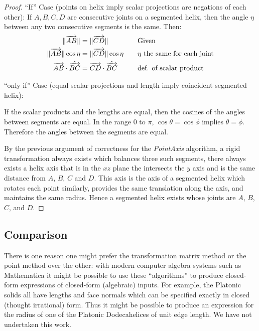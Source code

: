 \documentclass[11pt]{article}
\DeclarePairedDelimiter{\norm}{\lVert}{\rVert}
\begin{document}
{\begin{proof}
  ``If'' Case (points on helix imply scalar projections are negations of each other):
  If $A,B,C,D$ are consecutive joints on a segmented helix, then the angle $\eta$ between any two consecutive segments is the
  same. Then:
  \begin{alignat*}{2}
    \norm{\overrightarrow{AB}} &= \norm{\overrightarrow{CD}} &\quad &\text{Given}\\
    \norm{\overrightarrow{AB}}\cos{\eta} &= \norm{\overrightarrow{CD}}\cos{\eta} &\quad &\text{$\eta$ the same for each joint} \\
    \overrightarrow{AB} \cdot \hat{\overrightarrow{BC}} &= \overrightarrow{CD} \cdot \hat{\overrightarrow{BC}} &\quad &\text{def. of scalar product} \\
  \end{alignat*}

  ``only if'' Case (equal scalar projections and length imply coincident segmented helix):

  If the scalar products and the lengths are equal, then the cosines of the angles between segments are equal. In the range $0$ to $\pi$,
  $\cos{\theta} = \cos{\phi}$ implies $\theta = \phi$. Therefore the angles between the segments are equal.

  By the previous argument of correctness for the {\em PointAxis} algorithm, a rigid transformation always exists
  which balances three such segments, there always exists a helix axis that
  is in the $xz$ plane the intersects the $y$ axis and is the same distance from $A$, $B$, $C$ and $D$.
  This axis is the axis of a segmented helix which rotates each point similarly, provides the same translation along the axis,
  and maintains the same radius. Hence a segmented helix exists whose joints are $A$, $B$, $C$, and $D$.
\end{proof}

\subsection{Comparison}

There is one reason one might prefer the transformation matrix method or the point method over the other: with modern
computer algebra systems such as Mathematica\cite{Mathematica} it might be possible to use these ``algorithms'' to produce closed-form
expressions of closed-form (algebraic) inputs. For example, the Platonic solids all have lengths and face normals which
can be specified exactly in closed (thought irrational) form. Thus it might be possible to produce an expression for the
radius of one of the Platonic Dodecahelices of unit edge length. We have not undertaken this work.


}
\end{document}

